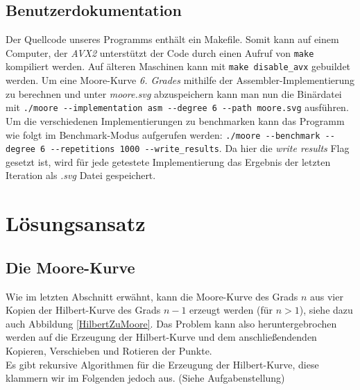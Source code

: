 \documentclass[course=erap]{aspdoc}
\begin{document}
\subsection{Benutzerdokumentation}
Der Quellcode unseres Programms enthält ein Makefile. Somit kann auf einem Computer, der \textit{AVX2} unterstützt der Code durch einen Aufruf von \texttt{make} kompiliert werden. Auf älteren Maschinen kann mit \texttt{make disable\_avx} gebuildet werden.
\newline
Um eine Moore-Kurve \textit{6. Grades} mithilfe der Assembler-Implementierung zu berechnen und unter \textit{moore.svg} abzuspeichern kann man nun die Binärdatei mit \texttt{./moore -{}-implementation asm -{}-degree 6 -{}-path moore.svg} ausführen. 
Um die verschiedenen Implementierungen zu benchmarken kann das Programm wie folgt im Benchmark-Modus aufgerufen werden: \texttt{./moore -{}-benchmark -{}-degree 6 -{}-repetitions 1000 -{}-write\_results}. Da hier die \textit{write results} Flag gesetzt ist, wird für jede getestete Implementierung das Ergebnis der letzten Iteration als \textit{.svg} Datei gespeichert. 

\section{Lösungsansatz}

\subsection{Die Moore-Kurve}

Wie im letzten Abschnitt erwähnt, kann die Moore-Kurve des Grads $n$ aus vier Kopien der Hilbert-Kurve des Grads $n-1$ erzeugt werden (für $n > 1$), siehe dazu auch Abbildung \ref{HilbertZuMoore}.
Das Problem kann also heruntergebrochen werden auf die Erzeugung der Hilbert-Kurve und dem anschließendenden Kopieren, Verschieben und Rotieren der Punkte. 
\\
Es gibt rekursive Algorithmen für die Erzeugung der Hilbert-Kurve, diese klammern wir im Folgenden jedoch aus. (Siehe Aufgabenstellung)
\FloatBarrier
\end{document}
